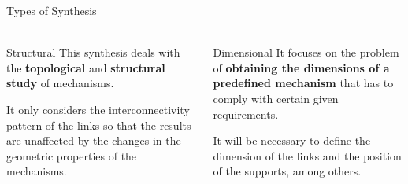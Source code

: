 \documentclass[aspectratio=169]{beamer}
\begin{document}
\begin{frame}[t]{Types of Synthesis}
\framesubtitle{}
\begin{columns}[T,onlytextwidth]
    \begin{column}{0.45\textwidth}
        \begin{exampleblock}{Structural}
            This synthesis deals with the \textbf{topological} and \textbf{structural study} of mechanisms. \smallskip
            
            It only considers the interconnectivity pattern of the links so that the results are unaffected by the changes in the geometric properties of the mechanisms.
        \end{exampleblock}
    \end{column}
    \begin{column}{0.45\textwidth}
        \begin{exampleblock}{Dimensional}
            It focuses on the problem of \textbf{obtaining the dimensions of a predefined mechanism} that has to comply with certain given requirements. \smallskip
            
            It will be necessary to deﬁne the dimension of the links and the position of the supports, among others.
        \end{exampleblock}
    \end{column}
\end{columns}
\end{frame}
\end{document}
